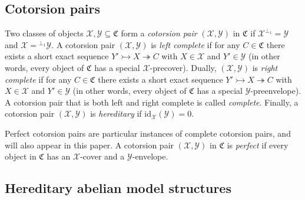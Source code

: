 \documentclass[10pt,reqno]{amsart}
\numberwithin{equation}{section}
\theoremstyle{remark}
\newcommand{\C}{\mathfrak{C}}
\newcommand{\X}{\mathcal{X}}
\newcommand{\Y}{\mathcal{Y}}
\newcommand{\id}{\mathrm{id}}
\begin{document}

\subsection*{Cotorsion pairs} 

Two classes of objects $\X, \Y \subseteq \mathfrak{C}$ form a \emph{cotorsion pair} $(\X,\Y)$ in $\mathfrak{C}$ if $\X^{\perp_1} = \Y$ and $\X = {}^{\perp_1}\Y$. A cotorsion pair $(\X,\Y)$ is \emph{left complete} if for any $C \in \mathfrak{C}$ there exists a short exact sequence $Y' \rightarrowtail X \twoheadrightarrow C$ with $X \in \mathcal{X}$ and $Y' \in \mathcal{Y}$ (in other words, every object of $\mathfrak{C}$ has a special $\X$-precover). Dually, $(\mathcal{X,Y})$ is \emph{right complete} if for any $C \in \mathfrak{C}$ there exists a short exact sequence $Y' \rightarrowtail X \twoheadrightarrow C$ with $X \in \mathcal{X}$ and $Y' \in \mathcal{Y}$ (in other words, every object of $\mathfrak{C}$ has a special $\Y$-preenvelope). A cotorsion pair that is both left and right complete is called \emph{complete}. Finally, a cotorsion pair $(\X,\Y)$ is \emph{hereditary} if $\id_{\X}(\Y) = 0$. 

Perfect cotorsion pairs are particular instances of complete cotorsion pairs, and will also appear in this paper. A cotorsion pair $(\X,\Y)$ in $\C$ is \emph{perfect} if every object in $\C$ has an $\X$-cover and a $\Y$-envelope. 



\subsection*{Hereditary abelian model structures} 
\end{document}
